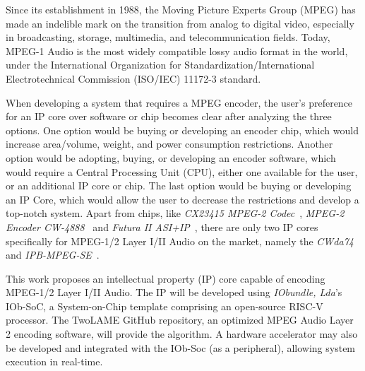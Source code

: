 

Since its establishment in 1988, the Moving Picture Experts Group (MPEG) has made an indelible mark on the transition from analog to digital video, especially in broadcasting, storage, multimedia, and telecommunication fields.
Today, MPEG-1 Audio is the most widely compatible lossy audio format in the world, under the International Organization for Standardization/International Electrotechnical Commission (ISO/IEC) 11172-3 standard.

When developing a system that requires a MPEG encoder, the user's preference for an IP core over software or chip becomes clear after analyzing the three options.
One option would be buying or developing an encoder chip, which would increase area/volume, weight, and power consumption restrictions. 
Another option would be adopting, buying, or developing an encoder software, which would require a Central Processing Unit (CPU), either one available for the user, or an additional IP core or chip. 
The last option would be buying or developing an IP Core, which would allow the user to decrease the restrictions and develop a top-notch system.
Apart from chips, like \textit{CX23415 MPEG-2 Codec}~\cite{cx23415}, \textit{MPEG-2 Encoder CW-4888}~\cite{cw4888} and \textit{Futura II ASI+IP}~\cite{futura}, there are only two IP cores specifically for MPEG-1/2 Layer I/II Audio on the market, namely the \textit{CWda74}~\cite{CWda74} and \textit{IPB-MPEG-SE}~\cite{ipb-mpeg-se}. 

This work proposes an intellectual property (IP) core capable of encoding MPEG-1/2 Layer I/II Audio. 
The IP will be developed using \textit{IObundle, Lda}'s IOb-SoC, a System-on-Chip template comprising an open-source RISC-V processor. The TwoLAME GitHub repository, an optimized MPEG Audio Layer 2 encoding software, will provide the algorithm.
A hardware accelerator may also be developed and integrated with the IOb-Soc (as a peripheral), allowing system execution in real-time.